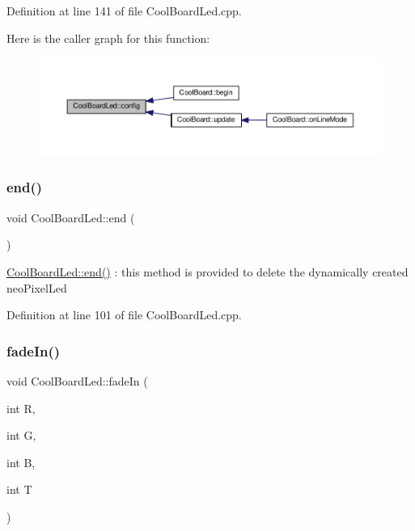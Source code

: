 Definition at line 141 of file Cool\+Board\+Led.\+cpp.

Here is the caller graph for this function\+:\nopagebreak
\begin{figure}[H]
\begin{center}
\leavevmode
\includegraphics[width=350pt]{class_cool_board_led_a1b60e5e30bea96c49ed62ed1bf1ffc8b_icgraph}
\end{center}
\end{figure}
\mbox{\label{class_cool_board_led_a69f323359e0c9f797422f2152b5d41ef}} 
\subsubsection{\texorpdfstring{end()}{end()}}
{\footnotesize\ttfamily void Cool\+Board\+Led\+::end (\begin{DoxyParamCaption}{ }\end{DoxyParamCaption})}

\hyperlink{class_cool_board_led_a69f323359e0c9f797422f2152b5d41ef}{Cool\+Board\+Led\+::end()} \+: this method is provided to delete the dynamically created neo\+Pixel\+Led 

Definition at line 101 of file Cool\+Board\+Led.\+cpp.

\mbox{\label{class_cool_board_led_aec915442a8441c7cd45c3279d3ff8821}} 
\subsubsection{\texorpdfstring{fade\+In()}{fadeIn()}}
{\footnotesize\ttfamily void Cool\+Board\+Led\+::fade\+In (\begin{DoxyParamCaption}\item[{int}]{R,  }\item[{int}]{G,  }\item[{int}]{B,  }\item[{int}]{T }\end{DoxyParamCaption})}

